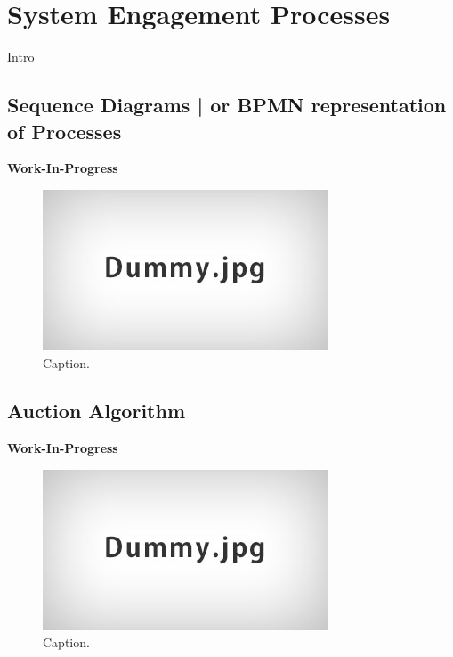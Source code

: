 \documentclass{llncs}
\begin{document}
{	%
	
	\section{System Engagement Processes}
		\label{s:section-5}	
	
	
		Intro
		


		\subsection{Sequence Diagrams | or BPMN representation of Processes}

			\textbf{Work-In-Progress}

			\begin{figure}[H]
				\centering
				\includegraphics[scale=0.4]{Figures/Dummy.jpg}
				\caption{Caption.}	
				\label{fig:sequence-diagram-1}
			\end{figure}


		
		\subsection{Auction Algorithm}
			\label{ss:auchtion-algorithm}				

			\textbf{Work-In-Progress}

			\begin{figure}[H]
				\centering
				\includegraphics[scale=0.4]{Figures/Dummy.jpg}
				\caption{Caption.}	
				\label{fig:auction-algorithm}
			\end{figure}

}
\end{document}
